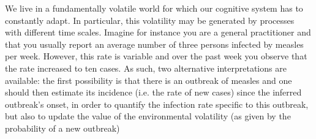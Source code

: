 \documentclass[12pt,english]{article}%
\newcommand{\AM}[1]{\textbf{\textcolor{blue}{[AM: #1]}}}
\begin{document}
We live in a fundamentally volatile world for which
our cognitive system has to constantly adapt.
In particular, this volatility may be generated
by processes with different time scales.
Imagine for instance you are a general practitioner and
that you usually report an average number of
three persons infected by measles per week.
However, this rate is variable and 
over the past week you observe that the rate increased to ten cases.
As such, two alternative interpretations are available:
the first possibility is that there is an outbreak of measles and
one should then estimate its incidence
(i.e. the rate of new cases)
since the inferred outbreak's onset, in order
to quantify the infection rate specific to this outbreak,
but also to update the value of the environmental volatility (as given by the probability of a new outbreak)
\end{document}
